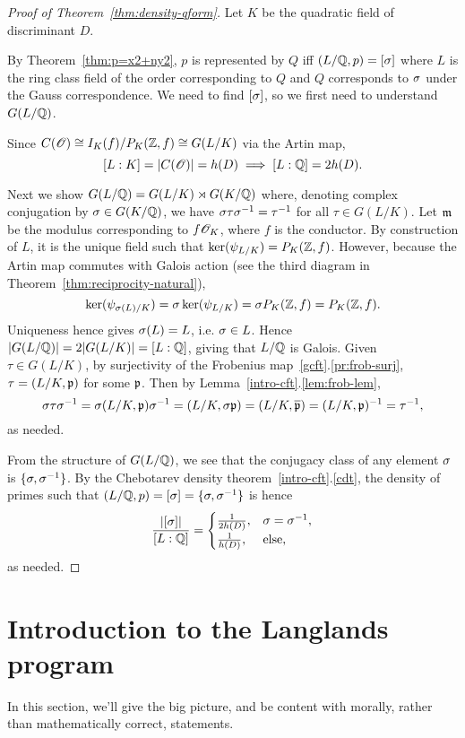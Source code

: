 \begin{proof}[Proof of Theorem~\ref{thm:density-qform}]
Let $K$ be the quadratic field of discriminant $D$.

By Theorem~\ref{thm:p=x2+ny2}, $p$ is represented by $Q$ iff $(L/\mathbb{Q},p)=[\sigma]$ where $L$ is the ring class field of the order corresponding to $Q$ and $Q$ corresponds to $\sigma$ under the Gauss correspondence. We need to find $[\sigma]$, so we first need to understand $G(L/\mathbb{Q})$.

Since $C(\mathscr{O})\cong I_K(f)/P_K(\mathbb{Z},f)\cong G(L/K)$ via the Artin map,
\[
[L:K]=|C(\mathscr{O})|=h(D)\implies [L:\mathbb{Q}]=2h(D).
\]

Next we show $G(L/\mathbb{Q})=G(L/K)\rtimes G(K/\mathbb{Q})$ where, denoting complex conjugation by $\sigma\in G(K/\mathbb{Q})$, we have $\sigma\tau\sigma^{-1}=\tau^{-1}$ for all $\tau\in G(L/K)$. Let $\mathfrak{m}$ be the modulus corresponding to $f\mathscr{O}_K$, where $f$ is the conductor. By construction of $L$, it is the unique field such that $\ker(\psi_{L/K})=P_K(\mathbb{Z},f)$. However, because the Artin map commutes with Galois action (see the third diagram in Theorem~\ref{thm:reciprocity-natural}),
\[
\ker(\psi_{\sigma(L)/K})=\sigma\ker(\psi_{L/K})=\sigma P_K(\mathbb{Z},f)=P_K(\mathbb{Z},f).
\]
Uniqueness hence gives $\sigma(L)=L$, i.e. $\sigma\in L$. Hence $|G(L/\mathbb{Q})|=2|G(L/K)|=[L:\mathbb{Q}]$, giving that $L/\mathbb{Q}$ is Galois. 
Given $\tau\in G(L/K)$, by surjectivity of the Frobenius map~\ref{gcft}.\ref{pr:frob-surj}, $\tau=(L/K,\mathfrak{p})$ for some $\mathfrak{p}$. Then by Lemma~\ref{intro-cft}.\ref{lem:frob-lem},
\[
\sigma\tau\sigma^{-1}=\sigma(L/K,\mathfrak{p})\sigma^{-1}=(L/K,\sigma\mathfrak{p})=(L/K,\overline{\mathfrak{p}})=(L/K,\mathfrak{p})^{-1}=\tau^{-1},
\]
as needed.

From the structure of $G(L/\mathbb{Q})$, we see that the conjugacy class of any element $\sigma$ is $\{\sigma,\sigma^{-1}\}$. By the Chebotarev density theorem~\ref{intro-cft}.\ref{cdt}, the density of primes such that $(L/\mathbb{Q},p)=[\sigma]=\{\sigma,\sigma^{-1}\}$ is hence
\[
\frac{|[\sigma]|}{[L:\mathbb{Q}]}=
\begin{cases}
\frac{1}{2h(D)},& \sigma=\sigma^{-1},\\
\frac{1}{h(D)},&\text{else},
\end{cases}
\]
as needed.
\end{proof}
\section{Introduction to the Langlands program}
In this section, we'll give the big picture, and be content with morally, rather than mathematically correct, statements.

